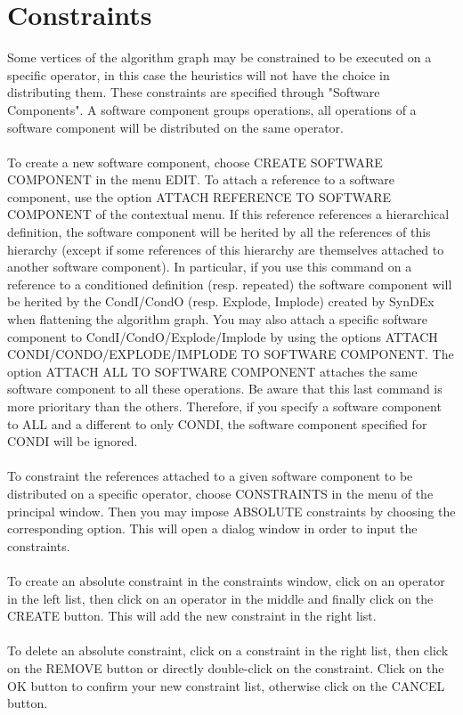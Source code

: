 \documentclass[11pt,twoside]{report}
\begin{document}
\chapter{Constraints}
Some vertices of the algorithm graph may be constrained to be executed
on a specific operator, in this case the heuristics will not have the
choice in distributing them. These constraints are specified through
"Software Components". A software component groups operations, all
operations of a software component will be distributed on the same
operator.\\\\
To create a new software component, choose CREATE SOFTWARE COMPONENT
in the menu EDIT. To attach a reference to a software component, use
the option ATTACH REFERENCE TO SOFTWARE COMPONENT of the contextual
menu. If this reference references a hierarchical definition, the
software component will be herited by all the references of this
hierarchy (except if some references of this hierarchy are themselves
attached to another software component). In particular, if you use
this command on a reference to a conditioned definition (resp.
repeated) the software component will be herited by the CondI/CondO
(resp. Explode, Implode) created by SynDEx when flattening the
algorithm graph. You may also attach a specific software component to
CondI/CondO/Explode/Implode by using the options ATTACH
CONDI/CONDO/EXPLODE/IMPLODE TO SOFTWARE COMPONENT. The option ATTACH
ALL TO SOFTWARE COMPONENT attaches the same software component to all
these operations. Be aware that this last command is more prioritary
than the others. Therefore, if you specify a software component to ALL
and a different to only CONDI, the software component specified
for CONDI will be ignored.\\\\
To constraint the references attached to a given software component to
be distributed on a specific operator, choose CONSTRAINTS in the menu
of the principal window. Then you may impose ABSOLUTE constraints by
choosing the corresponding option. This will open a dialog window in
order to input the
constraints.\\\\
To create an absolute constraint in the constraints window, click on
an operator in the left list, then click on an operator in the middle
and finally click on the CREATE button. This will add the new
constraint in the right list.\\\\
To delete an absolute constraint, click on a constraint in the right
list, then click on the REMOVE button or directly double-click on the
constraint. Click on the OK button to confirm your new constraint
list, otherwise click on the CANCEL button.
\end{document}

